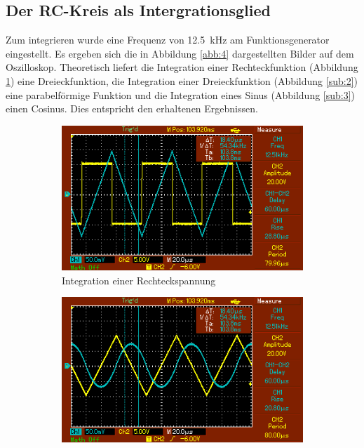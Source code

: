 \subsection{Der RC-Kreis als Intergrationsglied}
Zum integrieren wurde eine Frequenz von \SI{12.5}{\kilo\hertz} am Funktionsgenerator
eingestellt. Es ergeben sich die in Abbildung \ref{abb:4} dargestellten Bilder auf
dem Oszilloskop. Theoretisch liefert die Integration einer Rechteckfunktion (Abbildung \ref{sub:1}) eine
Dreieckfunktion, die Integration einer Dreieckfunktion (Abbildung \ref{sub:2}) eine parabelförmige Funktion
und die Integration eines Sinus (Abbildung \ref{sub:3}) einen Cosinus. Dies entspricht den erhaltenen Ergebnissen.
\begin{figure}
  \begin{subfigure}{0.49\textwidth}
  \centering
    \includegraphics[width=\textwidth]{rechteck.png}
    \qquad
    \caption{Integration einer Rechteckspannung}
    \label{sub:1}
  \end{subfigure}
  \begin{subfigure}{0.49\textwidth}
  \centering
    \includegraphics[width=\textwidth]{dreieck.png}

\end{subfigure}
\end{figure}
